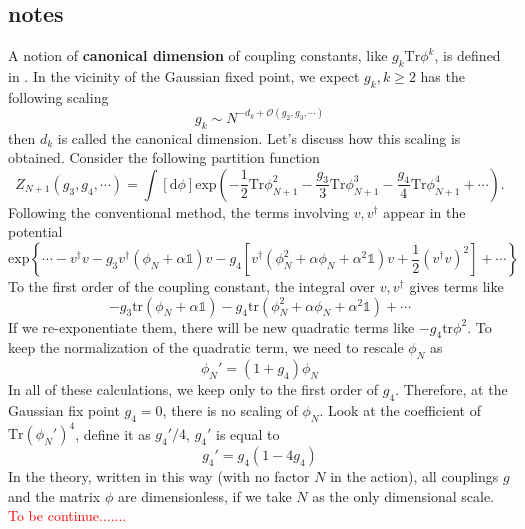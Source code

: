 \subsection{notes}
A notion of \textbf{canonical dimension} of coupling constants, like $g_k \mathrm{Tr} \phi^k$, is defined in \cite{lahoche_revisited_2020}. In the vicinity of the Gaussian fixed point, we expect $g_k,k\geq 2$ has the following scaling
\[g_k \sim N^{-d_k + \mathcal{O}(g_2,g_3,\cdots)}\]
then $d_k$ is called the canonical dimension. Let's discuss how this scaling is obtained. Consider the following partition function
\[Z_{N+1}(g_3,g_4,\cdots) = \int [\mathrm{d}\phi]\mathrm{exp}\left(-\frac{1}{2}\mathrm{Tr}\phi_{N+1}^2 - \frac{g_3}{3}\mathrm{Tr} \phi_{N+1}^3 - \frac{g_4}{4}\mathrm{Tr} \phi_{N+1}^4 + \cdots\right).\]
Following the conventional method, the terms involving $v,v^\dagger$ appear in the potential
\[\mathrm{exp}\left\{\cdots-v^\dagger v - g_3 v^\dagger (\phi_N+\alpha\mathds{1}) v - g_4 \left[v^\dagger (\phi_N ^2 + \alpha \phi_N + \alpha^2\mathds{1}) v + \frac{1}{2}(v^\dagger v)^2\right]+\cdots\right\}\]
To the first order of the coupling constant, the integral over $v,v^\dagger$ gives terms like
\[- g_3 \mathrm{tr}(\phi_N + \alpha\mathds{1}) - g_4 \mathrm{tr}(\phi_N^2 + \alpha\phi_N + \alpha^2 \mathds{1})+\cdots\]
If we re-exponentiate them, there will be new quadratic terms like $-g_4 \mathrm{tr}\phi^2$. To keep the normalization of the quadratic term, we need to rescale $\phi_N$ as
\[\phi_N' = (1+g_4)\phi_N\]
In all of these calculations, we keep only to the first order of $g_4$. Therefore, at the Gaussian fix point $g_4=0$, there is no scaling of $\phi_N$. Look at the coefficient of $\mathrm{Tr}(\phi_N')^4$, define it as $g_4'/4$, $g_4'$ is equal to
\[g_4' = g_4 (1 - 4 g_4)\]
In the theory, written in this way (with no factor $N$ in the action), all couplings $g$ and the matrix $\phi$ are dimensionless, if we take $N$ as the only dimensional scale.
\textcolor{red}{To be continue.......}
